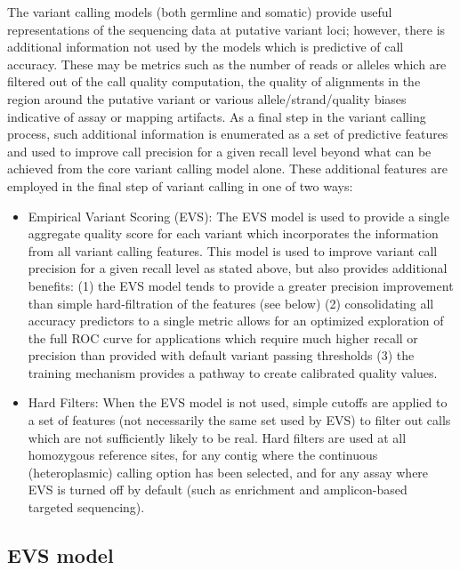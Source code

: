 \documentclass{article}
\begin{document}
The variant calling models (both germline and somatic) provide useful representations of the sequencing data at putative variant loci; however, there is additional information not used by the models which is predictive of call accuracy. These may be metrics such as the number of reads or alleles which are filtered out of the call quality computation, the quality of alignments in the region around the putative variant or various allele/strand/quality biases indicative of assay or mapping artifacts. As a final step in the variant calling process, such additional information is enumerated as a set of predictive features and used to improve call precision for a given recall level beyond what can be achieved from the core variant calling model alone. These additional features are employed in the final step of variant calling in one of two ways:

\begin{itemize}
    \item Empirical Variant Scoring (EVS):
    The EVS model is used to provide a single aggregate quality score for each variant which incorporates the information from all variant calling features. This model is used to improve variant call precision for a given recall level as stated above, but also provides additional benefits: (1) the EVS model tends to provide a greater precision improvement than simple hard-filtration of the features (see below) (2) consolidating all accuracy predictors to a single metric allows for an optimized exploration of the full ROC curve for applications which require much higher recall or precision than provided with default variant passing thresholds (3) the training mechanism provides a pathway to create calibrated quality values.
    \item Hard Filters:
    When the EVS model is not used, simple cutoffs are applied to a set of features (not necessarily the same set used by EVS) to filter out calls which are not sufficiently likely to be real. Hard filters are used at all homozygous reference sites, for any contig where the continuous (heteroplasmic) calling option has been selected, and for any assay where EVS is turned off by default (such as enrichment and amplicon-based targeted sequencing).
\end{itemize}


\subsection{EVS model}
\label{sec:EVSModel}
\end{document}
